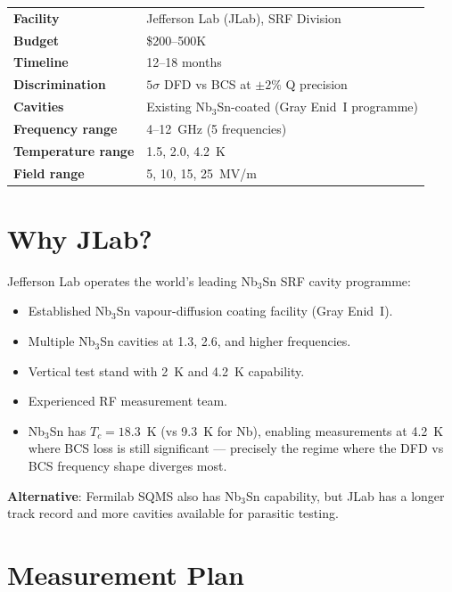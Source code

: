 \documentclass[11pt]{article}
\begin{document}
\begin{tcolorbox}[colback=proposalcolor!5!white, colframe=proposalcolor,
  title=\textbf{Nb$_3$Sn Q-RATIO SCAN: SUMMARY CARD}]
\begin{tabular}{@{}ll@{}}
\textbf{Facility} & Jefferson Lab (JLab), SRF Division \\
\textbf{Budget} & \$200--500K \\
\textbf{Timeline} & 12--18 months \\
\textbf{Discrimination} & $5\sigma$ DFD vs BCS at $\pm 2\%$ Q precision \\
\textbf{Cavities} & Existing Nb$_3$Sn-coated (Gray Enid~I programme) \\
\textbf{Frequency range} & 4--12~GHz (5 frequencies) \\
\textbf{Temperature range} & 1.5, 2.0, 4.2~K \\
\textbf{Field range} & 5, 10, 15, 25~MV/m \\
\end{tabular}
\end{tcolorbox}


\section{Why JLab?}

Jefferson Lab operates the world's leading Nb$_3$Sn SRF cavity
programme:
\begin{itemize}[nosep]
\item Established Nb$_3$Sn vapour-diffusion coating facility (Gray Enid~I).
\item Multiple Nb$_3$Sn cavities at 1.3, 2.6, and higher frequencies.
\item Vertical test stand with 2~K and 4.2~K capability.
\item Experienced RF measurement team.
\item Nb$_3$Sn has $T_c = 18.3$~K (vs 9.3~K for Nb), enabling measurements
  at 4.2~K where BCS loss is still significant --- precisely the regime
  where the DFD vs BCS frequency shape diverges most.
\end{itemize}

\textbf{Alternative}: Fermilab SQMS also has Nb$_3$Sn capability, but
JLab has a longer track record and more cavities available for
parasitic testing.


\section{Measurement Plan}
\end{document}
